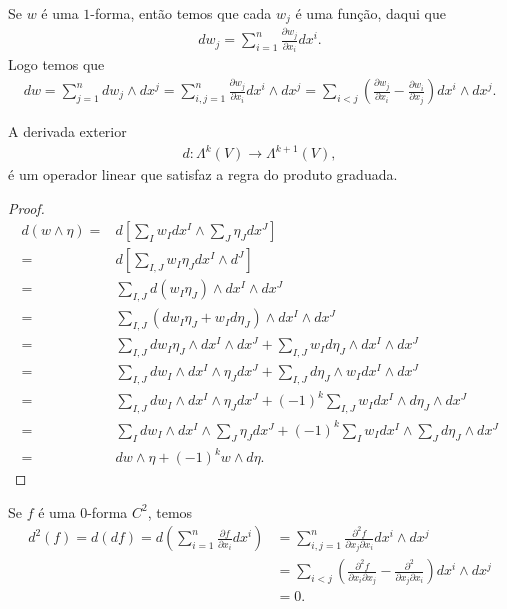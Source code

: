 \begin{note}
  Se $w$ é uma $1$-forma, então temos que cada $w_j$ é uma função, daqui que
  \begin{align*}
    dw_j=\sum_{i=1}^{n}\frac{\partial w_j}{\partial x_i}dx^{i}.
  \end{align*}
  Logo temos que
  \begin{align*}
    dw=\sum_{j=1}^{n}dw_j\wedge dx^{j}=\sum_{i,j=1}^{n}\frac{\partial w_j}{\partial x_i}dx^{i}\wedge dx^{j}=\sum_{i<j}\left( \frac{\partial w_j}{\partial x_i}-\frac{\partial w_i}{\partial x_j} \right)dx^{i}\wedge dx^{j}.
  \end{align*}
\end{note}
\begin{proposition}
  A derivada exterior
  \begin{align*}
    d:\Lambda^{k}(V)\to\Lambda^{k+1}(V),
  \end{align*}
  é um operador linear que satisfaz a regra do produto graduada.
\end{proposition}
\begin{proof} 
  \begin{align*}
    d(w\wedge\eta)=&d\left[ \sum_{I}w_Idx^{I}\wedge\sum_{J}\eta_{J}dx^{J} \right]\\
    =&d\left[ \sum_{I,J}w_{I}\eta_{J}dx^{I}\wedge d^{J} \right]\\
    =&\sum_{I,J}d(w_I\eta_{{J}})\wedge dx^{I}\wedge dx^{J}\\
    =&\sum_{I,J}(dw_I\eta_{J}+w_Id\eta_J)\wedge dx^{I}\wedge dx^{J}\\
    =&\sum_{I,J}dw_I\eta_J\wedge dx^{I}\wedge dx^{J} + \sum_{I,J}w_Id\eta_J\wedge dx^{I}\wedge dx^{J}\\
    =&\sum_{I,J}dw_I\wedge dx^{I}\wedge \eta_J dx^{J}+ \sum_{I,J}d\eta_J\wedge w_Idx^{I}\wedge dx^{J}\\
    =&\sum_{I,J}dw_I\wedge dx^{I}\wedge \eta_J dx^{J}+ (-1)^{k}\sum_{I,J} w_Idx^{I}\wedge d\eta_{J}\wedge dx^{J}\\
    =&\sum_{I}dw_I\wedge dx^{I}\wedge \sum_{J}\eta_J dx^{J}+ (-1)^{k}\sum_{I} w_Idx^{I}\wedge \sum_{J}d\eta_J\wedge dx^{J}\\
    =&dw\wedge \eta+(-1)^{k}w\wedge d\eta.
  \end{align*}
\end{proof}
\begin{note}
  Se $f$ é uma $0$-forma $C^{2}$, temos
  \begin{align*}
    d^{2}(f)=d(df)=d\left( \sum_{i=1}^{n}\frac{\partial f}{\partial x_i} dx^{i}\right)&=\sum_{i,j=1}^{n}\frac{\partial^{2}f }{\partial x_j\partial x_i}dx^{i}\wedge dx^{j}\\
    &=\sum_{i<j}\left( \frac{\partial^2 f }{\partial x_i\partial x_j}-\frac{\partial^{2} }{\partial x_j\partial x_i} \right)dx^{i}\wedge dx^{j}\\
    &=0.
  \end{align*}
\end{note}
